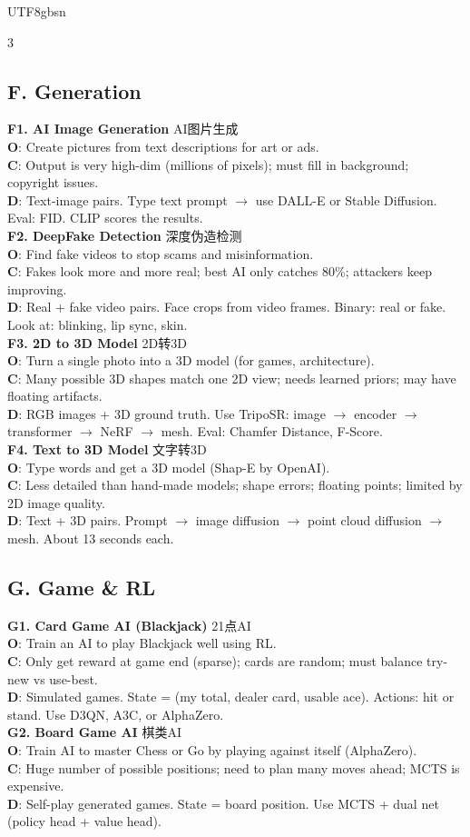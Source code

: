 \documentclass[9pt,landscape,a4paper]{article}
\newcommand{\zhint}[1]{{\scriptsize\color{gray!70!black}#1}}
\newcommand{\scenario}[5]{%
\textbf{#1} \zhint{#2}\\
\textbf{O}: #3\\
\textbf{C}: #4\\
\textbf{D}: #5\\[-3pt]
}
\begin{document}
\begin{CJK}{UTF8}{gbsn}
\begin{multicols}{3}
\subsection{F. Generation}

\scenario{F1. AI Image Generation}{AI图片生成}
{Create pictures from text descriptions for art or ads.}
{Output is very high-dim (millions of pixels); must fill in background; copyright issues.}
{Text-image pairs. Type text prompt $\to$ use DALL-E or Stable Diffusion. Eval: FID. CLIP scores the results.}

\scenario{F2. DeepFake Detection}{深度伪造检测}
{Find fake videos to stop scams and misinformation.}
{Fakes look more and more real; best AI only catches 80\%; attackers keep improving.}
{Real + fake video pairs. Face crops from video frames. Binary: real or fake. Look at: blinking, lip sync, skin.}

\scenario{F3. 2D to 3D Model}{2D转3D}
{Turn a single photo into a 3D model (for games, architecture).}
{Many possible 3D shapes match one 2D view; needs learned priors; may have floating artifacts.}
{RGB images + 3D ground truth. Use TripoSR: image $\to$ encoder $\to$ transformer $\to$ NeRF $\to$ mesh. Eval: Chamfer Distance, F-Score.}

\scenario{F4. Text to 3D Model}{文字转3D}
{Type words and get a 3D model (Shap-E by OpenAI).}
{Less detailed than hand-made models; shape errors; floating points; limited by 2D image quality.}
{Text + 3D pairs. Prompt $\to$ image diffusion $\to$ point cloud diffusion $\to$ mesh. About 13 seconds each.}

\subsection{G. Game \& RL}

\scenario{G1. Card Game AI (Blackjack)}{21点AI}
{Train an AI to play Blackjack well using RL.}
{Only get reward at game end (sparse); cards are random; must balance try-new vs use-best.}
{Simulated games. State = (my total, dealer card, usable ace). Actions: hit or stand. Use D3QN, A3C, or AlphaZero.}

\scenario{G2. Board Game AI}{棋类AI}
{Train AI to master Chess or Go by playing against itself (AlphaZero).}
{Huge number of possible positions; need to plan many moves ahead; MCTS is expensive.}
{Self-play generated games. State = board position. Use MCTS + dual net (policy head + value head).}


\end{multicols}
\end{CJK}
\end{document}
